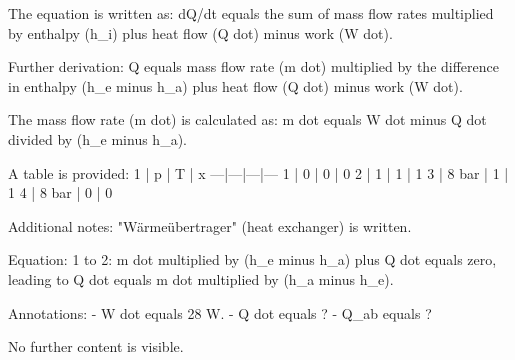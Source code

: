 The equation is written as:  
dQ/dt equals the sum of mass flow rates multiplied by enthalpy (h_i) plus heat flow (Q dot) minus work (W dot).  

Further derivation:  
Q equals mass flow rate (m dot) multiplied by the difference in enthalpy (h_e minus h_a) plus heat flow (Q dot) minus work (W dot).  

The mass flow rate (m dot) is calculated as:  
m dot equals W dot minus Q dot divided by (h_e minus h_a).  

A table is provided:  
1 | p | T | x  
---|---|---|---  
1 | 0 | 0 | 0  
2 | 1 | 1 | 1  
3 | 8 bar | 1 | 1  
4 | 8 bar | 0 | 0  

Additional notes:  
"Wärmeübertrager" (heat exchanger) is written.  

Equation:  
1 to 2: m dot multiplied by (h_e minus h_a) plus Q dot equals zero, leading to Q dot equals m dot multiplied by (h_a minus h_e).  

Annotations:  
- W dot equals 28 W.  
- Q dot equals ?  
- Q_ab equals ?  

No further content is visible.